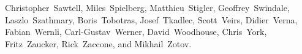{Christopher~Sawtell,    %
Miles~Spielberg,        %
Matthieu~Stigler,       %
Geoffrey~Swindale,      %
Laszlo~Szathmary,       %
Boris~Tobotras,         %
Josef~Tkadlec,          %
Scott~Veirs,            %
Didier~Verna,           %
Fabian~Wernli,          %
Carl-Gustav~Werner,     %
David~Woodhouse,        %
Chris~York,             %
Fritz~Zaucker,          %
Rick~Zaccone,           %
and Mikhail~Zotov.      %

}




\pagebreak
\endinput
%

